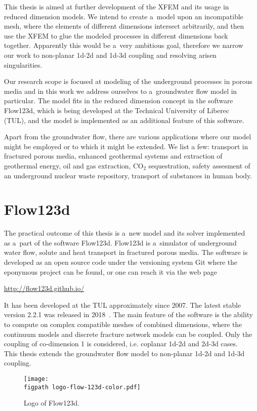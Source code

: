 This thesis is aimed at further development of the XFEM and its usage in reduced dimension models. 
We intend to create a~model upon an incompatible mesh, where the elements of different dimensions intersect
arbitrarily, and then use the XFEM to glue the modeled processes in different dimensions back together. 
Apparently this would be a~very ambitious goal, therefore we narrow our work to non-planar 1d-2d and 1d-3d coupling
and resolving arisen singularities. 

Our research scope is focused at modeling of the underground processes in porous media
and in this work we address ourselves to a~groundwater flow model in particular.
The model fits in the reduced dimension concept in the software Flow123d, which is being developed at the
Technical University of Liberec (TUL), and the model is implemented as an additional feature of this software.

Apart from the groundwater flow, there are various applications where our model might be employed or to which it might be extended.
We list a few: transport in fractured porous media, enhanced geothermal systems and extraction of geothermal energy,
oil and gas extraction, CO$_2$ sequestration, safety assesment of an underground nuclear waste repository,
transport of substances in human body.


\section{Flow123d}
\label{sec:soa_flow123d}

The practical outcome of this thesis is a~new model and its solver implemented as a~part of the software Flow123d.
Flow123d is a~simulator of underground water flow, solute and heat transport in fractured porous media. The software is
developed as an open source code under the versioning system Git where the eponymous project can be found, or 
one can reach it via the web page %
%
\begin{center}
\url{http://flow123d.github.io/}
\end{center}

It has been developed at the TUL approximately since 2007.
The latest stable version 2.2.1 was released in 2018~\cite{flow123d}.
The main feature of the software is the ability to compute on complex compatible meshes of combined dimensions,
where the continuum models and discrete fracture network models can be coupled. Only the coupling of co-dimension 1
is considered, i.e. coplanar 1d-2d and 2d-3d cases.
This thesis extends the groundwater flow model to non-planar 1d-2d and 1d-3d coupling.
%
\begin{figure}[!htb]
  \centering
  \texttt{[image: \\figpath logo-flow-123d-color.pdf]}
  \caption{Logo of Flow123d.}
  \label{fig:logo_flow123d}
\end{figure}

